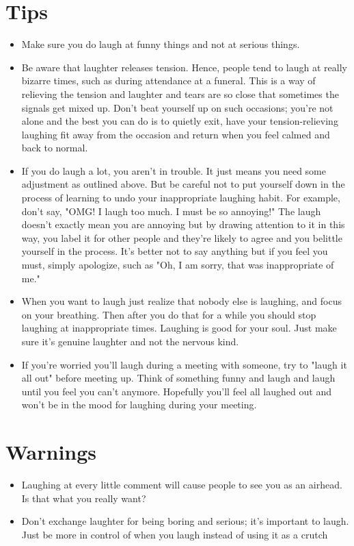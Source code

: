 \documentclass{article}
\begin{document}
\section{Tips}
\begin{itemize}
\item{Make sure you do laugh at funny things and not at serious things.}
\item{Be aware that laughter releases tension. Hence, people tend to laugh at really bizarre times, such as during attendance at a funeral. This is a way of relieving the tension and laughter and tears are so close that sometimes the signals get mixed up. Don't beat yourself up on such occasions; you're not alone and the best you can do is to quietly exit, have your tension-relieving laughing fit away from the occasion and return when you feel calmed and back to normal.}
\item{If you do laugh a lot, you aren't in trouble. It just means you need some adjustment as outlined above. But be careful not to put yourself down in the process of learning to undo your inappropriate laughing habit. For example, don't say, "OMG! I laugh too much. I must be so annoying!" The laugh doesn't exactly mean you are annoying but by drawing attention to it in this way, you label it for other people and they're likely to agree and you belittle yourself in the process. It's better not to say anything but if you feel you must, simply apologize, such as "Oh, I am sorry, that was inappropriate of me."}
\item{When you want to laugh just realize that nobody else is laughing, and focus on your breathing. Then after you do that for a while you should stop laughing at inappropriate times.
Laughing is good for your soul. Just make sure it's genuine laughter and not the nervous kind.}
\item{If you're worried you'll laugh during a meeting with someone, try to "laugh it all out" before meeting up. Think of something funny and laugh and laugh until you feel you can't anymore. Hopefully you'll feel all laughed out and won't be in the mood for laughing during your meeting.}
\end{itemize}

\section{Warnings}
\begin{itemize}
\item{Laughing at every little comment will cause people to see you as an airhead. Is that what you really want?}
\item{Don't exchange laughter for being boring and serious; it's important to laugh. Just be more in control of when you laugh instead of using it as a crutch}
\end{itemize}
\end{document}
